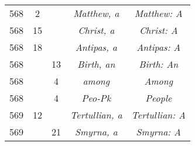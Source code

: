 \documentclass[a4paper,11pt]{article}
\begin{document}
\begin{center}
\begin{tabular}{|c|c|c|c|c|}
    568 & \hphantom{0}2 & & \textit{Matthew, a} & \textit{Matthew: A} \\
    568 & 15 & & \textit{Christ, a} & \textit{Christ: A} \\
    568 & 18 & & \textit{Antipas, a} & \textit{Antipas: A} \\
    568 & & 13 & \textit{Birth, an} & \textit{Birth: An} \\
    568 & & \hphantom{0}4 & \textit{among} & \textit{Among} \\
    568 & & \hphantom{0}4 & \textit{Peo-Pk} & \textit{People} \\
    569 & 12 & & \textit{Tertullian, a} & \textit{Tertullian: A} \\
    569 & & 21 & \textit{Smyrna, a} & \textit{Smyrna: A} \\
    \hline
  \end{tabular}





  \newpage


\end{center}
\end{document}
